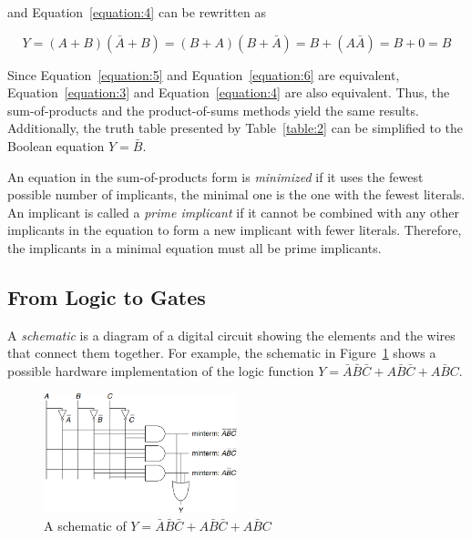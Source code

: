 \documentclass[12pt]{article}
\begin{document}
\begin{enumerate}
    and Equation~\ref{equation:4} can be rewritten as

    \begin{equation} \label{equation:6}
        Y = (A + B)(\bar{A} + B) = (B + A)(B + \bar{A}) = B + (A\bar{A}) = B + 0 = B
    \end{equation}

    Since Equation~\ref{equation:5} and Equation~\ref{equation:6} are equivalent, Equation~\ref{equation:3} and Equation~\ref{equation:4} are also equivalent. Thus, the sum-of-products and the product-of-sums methods yield the same results. Additionally, the truth table presented by Table~\ref{table:2} can be simplified to the Boolean equation $Y = \bar{B}$.

    An equation in the sum-of-products form is \textit{minimized} if it uses the fewest possible number of implicants, the minimal one is the one with the fewest literals. An implicant is called a \textit{prime implicant} if it cannot be combined with any other implicants in the equation to form a new implicant with fewer literals. Therefore, the implicants in a minimal equation must all be prime implicants.
\end{enumerate}

\subsection{From Logic to Gates}

A \textit{schematic} is a diagram of a digital circuit showing the elements and the wires that connect them together. For example, the schematic in Figure~\ref{figure:2} shows a possible hardware implementation of the logic function $Y = \bar{A}\bar{B}\bar{C} + A\bar{B}\bar{C} + A\bar{B}C$.

\begin{figure}[h]
    \centering
    \includegraphics[width=0.5\textwidth]{schematic.png}
    \caption{A schematic of $Y = \bar{A}\bar{B}\bar{C} + A\bar{B}\bar{C} + A\bar{B}C$}
    \label{figure:2}
\end{figure}
\end{document}
